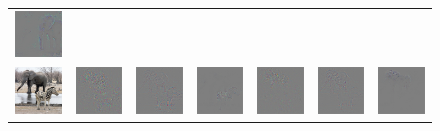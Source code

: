\begin{figure}
\begin{center}
\begin{tabular}{ccccccc}
\includegraphics[width=0.14\linewidth,height=0.11\linewidth]{figs/examples/googlenet/soft/zeb-ele1_diff_387} \\
\includegraphics[width=0.14\linewidth,height=0.11\linewidth]{figs/examples/googlenet/oxford/zeb-ele2} &
\includegraphics[width=0.14\linewidth,height=0.11\linewidth]{figs/examples/googlenet/oxford/zeb-ele2_diff_341} &
\includegraphics[width=0.14\linewidth,height=0.11\linewidth]{figs/examples/googlenet/deconv/zeb-ele2_diff_341} &
\includegraphics[width=0.14\linewidth,height=0.11\linewidth]{figs/examples/googlenet/soft/zeb-ele2_diff_341} &
\includegraphics[width=0.14\linewidth,height=0.11\linewidth]{figs/examples/googlenet/oxford/zeb-ele2_diff_387} &
\includegraphics[width=0.14\linewidth,height=0.11\linewidth]{figs/examples/googlenet/deconv/zeb-ele2_diff_387} &
\includegraphics[width=0.14\linewidth,height=0.11\linewidth]{figs/examples/googlenet/soft/zeb-ele2_diff_387} \\

\end{tabular}
\end{center}
\end{figure}
